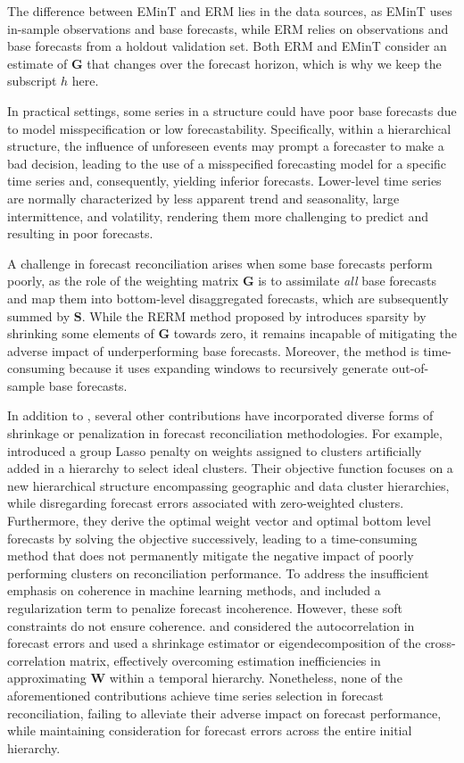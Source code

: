 \documentclass[
  11pt]{article}
\theoremstyle{plain}
\theoremstyle{remark}
\begin{document}
The difference between EMinT and ERM lies in the data sources, as EMinT
uses in-sample observations and base forecasts, while ERM relies on
observations and base forecasts from a holdout validation set. Both ERM
and EMinT consider an estimate of \(\bm{G}\) that changes over the
forecast horizon, which is why we keep the subscript \(h\) here.

In practical settings, some series in a structure could have poor base
forecasts due to model misspecification or low forecastability.
Specifically, within a hierarchical structure, the influence of
unforeseen events may prompt a forecaster to make a bad decision,
leading to the use of a misspecified forecasting model for a specific
time series and, consequently, yielding inferior forecasts. Lower-level
time series are normally characterized by less apparent trend and
seasonality, large intermittence, and volatility, rendering them more
challenging to predict and resulting in poor forecasts.

A challenge in forecast reconciliation arises when some base forecasts
perform poorly, as the role of the weighting matrix \(\bm{G}\) is to
assimilate \emph{all} base forecasts and map them into bottom-level
disaggregated forecasts, which are subsequently summed by \(\bm{S}\).
While the RERM method proposed by \citet{Ben_Taieb2019-be} introduces
sparsity by shrinking some elements of \(\bm{G}\) towards zero, it
remains incapable of mitigating the adverse impact of underperforming
base forecasts. Moreover, the method is time-consuming because it uses
expanding windows to recursively generate out-of-sample base forecasts.

In addition to \citet{Ben_Taieb2019-be}, several other contributions
have incorporated diverse forms of shrinkage or penalization in forecast
reconciliation methodologies. For example, \citet{Pang2022-hi}
introduced a group Lasso penalty on weights assigned to clusters
artificially added in a hierarchy to select ideal clusters. Their
objective function focuses on a new hierarchical structure encompassing
geographic and data cluster hierarchies, while disregarding forecast
errors associated with zero-weighted clusters. Furthermore, they derive
the optimal weight vector and optimal bottom level forecasts by solving
the objective successively, leading to a time-consuming method that does
not permanently mitigate the negative impact of poorly performing
clusters on reconciliation performance. To address the insufficient
emphasis on coherence in machine learning methods,
\citet{Mishchenko2019-as} and \citet{Gleason2020-fo} included a
regularization term to penalize forecast incoherence. However, these
soft constraints do not ensure coherence. \citet{Nystrup2020-te} and
\citet{Nystrup2021-di} considered the autocorrelation in forecast errors
and used a shrinkage estimator or eigendecomposition of the
cross-correlation matrix, effectively overcoming estimation
inefficiencies in approximating \(\bm{W}\) within a temporal hierarchy.
Nonetheless, none of the aforementioned contributions achieve time
series selection in forecast reconciliation, failing to alleviate their
adverse impact on forecast performance, while maintaining consideration
for forecast errors across the entire initial hierarchy.
\end{document}
